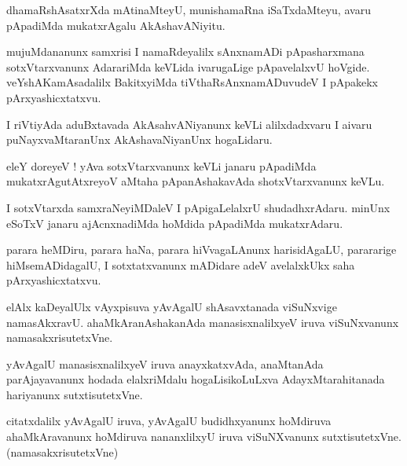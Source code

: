 \documentclass{article}
\begin{document}
\begin{mn}%
dhamaRshAsatxrXda mAtinaMteyU, munishamaRna iSaTxdaMteyu, avaru pApadiMda mukatxrAgalu 
AkAshavANiyitu.
\end{mn}

\begin{mn}%
mujuMdananunx samxrisi I namaRdeyalilx sAnxnamADi pApasharxmana sotxVtarxvanunx AdarariMda 
keVLida ivarugaLige pApavelalxvU hoVgide. veYshAKamAsadalilx BakitxyiMda 
tiVthaRsAnxnamADuvudeV I pApakekx pArxyashicxtatxvu.
\end{mn}

\begin{mn}%
I riVtiyAda aduBxtavada AkAsahvANiyanunx keVLi alilxdadxvaru I aivaru puNayxvaMtaranUnx 
AkAshavaNiyanUnx hogaLidaru.
\end{mn}

\begin{mn}%
eleY doreyeV ! yAva sotxVtarxvanunx keVLi janaru pApadiMda mukatxrAgutAtxreyoV aMtaha 
pApanAshakavAda shotxVtarxvanunx keVLu.
\end{mn}

\begin{mn}%
I sotxVtarxda samxraNeyiMDaleV I pApigaLelalxrU shudadhxrAdaru. minUnx eSoTxV janaru 
ajAcnxnadiMda hoMdida pApadiMda mukatxrAdaru.
\end{mn}

\begin{mn}%
parara heMDiru, parara haNa, parara hiVvagaLAnunx harisidAgaLU, parararige 
hiMsemADidagalU, I sotxtatxvanunx mADidare adeV avelalxkUkx saha pArxyashicxtatxvu.
\end{mn}

\begin{mn}%
elAlx kaDeyalUlx vAyxpisuva yAvAgalU shAsavxtanada viSuNxvige namasAkxravU. 
ahaMkAranAshakanAda manasisxnalilxyeV iruva viSuNxvanunx namasakxrisutetxVne.
\end{mn}

\begin{mn}%
yAvAgalU manasisxnalilxyeV iruva anayxkatxvAda, anaMtanAda parAjayavanunx hodada 
elalxriMdalu hogaLisikoLuLxva AdayxMtarahitanada hariyanunx sutxtisutetxVne.
\end{mn}

\begin{mn}%
citatxdalilx yAvAgalU iruva, yAvAgalU budidhxyanunx hoMdiruva ahaMkAravanunx hoMdiruva 
nananxlilxyU iruva viSuNXvanunx sutxtisutetxVne. (namasakxrisutetxVne)
\end{mn}
\end{document}

